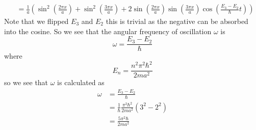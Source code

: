 \documentclass[11pt]{article}
\numberwithin{equation}{section}
\begin{document}
\begin{enumerate}[(a)]
\begin{align*}
&= \frac{1}{a}\left(\sin^2\left(\frac{2\pi x}{a}\right) + \sin^2\left(\frac{3\pi x}{a}\right) + 2\sin\left(\frac{2\pi x}{a}\right)\sin\left(\frac{3\pi x}{a}\right)\cos\left(\frac{E_3-E_2}{\hbar}t\right)\right)
\end{align*}
Note that we flipped $E_3$ and $E_2$ this is trivial as the negative can be absorbed into the cosine. So we see that the angular frequency of oscillation $\omega$ is
$$\omega = \frac{E_3-E_2}{\hbar}$$
where
$$E_n = \frac{n^2\pi^2\hbar^2}{2ma^2}$$
so we see that $\omega$ is calculated as
\begin{align*}
\omega &= \frac{E_3-E_2}{\hbar}\\
&= \frac{1}{\hbar}\frac{\pi^2\hbar^2}{2ma^2}(3^2-2^2)\\
&= \frac{5\pi^2\hbar}{2ma^2}
\end{align*}


\end{enumerate}
\end{document}
